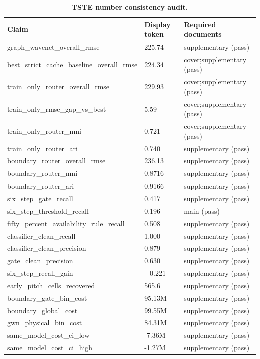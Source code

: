 \begin{table}[H]
\centering
\scriptsize
\setlength{\tabcolsep}{3pt}
\renewcommand{\arraystretch}{1.05}
\caption*{\textbf{TSTE number consistency audit.}}
\begin{tabular}{lll}
\toprule
Claim & Display token & Required documents \\
\midrule
graph\_wavenet\_overall\_rmse & 225.74 & supplementary (pass) \\
best\_strict\_cache\_baseline\_overall\_rmse & 224.34 & cover;supplementary (pass) \\
train\_only\_router\_overall\_rmse & 229.93 & cover;supplementary (pass) \\
train\_only\_rmse\_gap\_vs\_best & 5.59 & cover;supplementary (pass) \\
train\_only\_router\_nmi & 0.721 & cover;supplementary (pass) \\
train\_only\_router\_ari & 0.740 & supplementary (pass) \\
boundary\_router\_overall\_rmse & 236.13 & supplementary (pass) \\
boundary\_router\_nmi & 0.8716 & supplementary (pass) \\
boundary\_router\_ari & 0.9166 & supplementary (pass) \\
six\_step\_gate\_recall & 0.417 & supplementary (pass) \\
six\_step\_threshold\_recall & 0.196 & main (pass) \\
fifty\_percent\_availability\_rule\_recall & 0.508 & supplementary (pass) \\
classifier\_clean\_recall & 1.000 & supplementary (pass) \\
classifier\_clean\_precision & 0.879 & supplementary (pass) \\
gate\_clean\_precision & 0.630 & supplementary (pass) \\
six\_step\_recall\_gain & +0.221 & supplementary (pass) \\
early\_pitch\_cells\_recovered & 565.6 & supplementary (pass) \\
boundary\_gate\_bin\_cost & 95.13M & supplementary (pass) \\
boundary\_global\_cost & 99.55M & supplementary (pass) \\
gwn\_physical\_bin\_cost & 84.31M & supplementary (pass) \\
same\_model\_cost\_ci\_low & -7.36M & supplementary (pass) \\
same\_model\_cost\_ci\_high & -1.27M & supplementary (pass) \\

\end{tabular}
\end{table}
